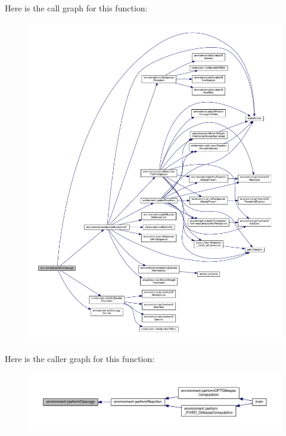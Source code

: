 Here is the call graph for this function\-:\nopagebreak
\begin{figure}[H]
\begin{center}
\leavevmode
\includegraphics[width=350pt]{a00011_aa4ed307a123c402166cfc7f6ed99043a_cgraph}
\end{center}
\end{figure}




Here is the caller graph for this function\-:\nopagebreak
\begin{figure}[H]
\begin{center}
\leavevmode
\includegraphics[width=350pt]{a00011_aa4ed307a123c402166cfc7f6ed99043a_icgraph}
\end{center}
\end{figure}


